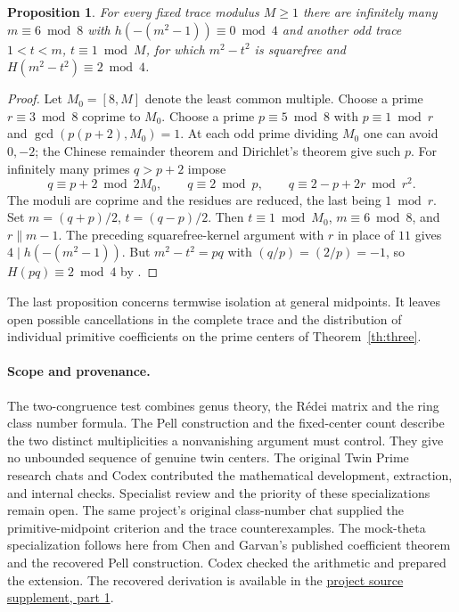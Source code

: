 \documentclass[11pt]{article}
\newtheorem{proposition}[theorem]{Proposition}
\begin{document}
\begin{proposition}\label{prop:fixedtrace}
For every fixed trace modulus $M\ge1$ there are infinitely many
$m\equiv6\bmod8$ with $h(-(m^2-1))\equiv0\bmod4$ and another
odd trace $1<t<m$, $t\equiv1\bmod M$, for which
$m^2-t^2$ is squarefree and $H(m^2-t^2)\equiv2\bmod4$.
\end{proposition}
\begin{proof}
Let $M_0=[8,M]$ denote the least common multiple. Choose a prime
$r\equiv3\bmod8$ coprime to $M_0$. Choose a prime $p\equiv5\bmod8$
with $p\equiv1\bmod r$ and $\gcd(p(p+2),M_0)=1$.
At each odd prime dividing $M_0$ one can avoid $0,-2$; the Chinese
remainder theorem and Dirichlet's theorem give such $p$. For infinitely
many primes $q>p+2$ impose
\[
 q\equiv p+2\bmod{2M_0},\qquad q\equiv2\bmod p,\qquad
 q\equiv2-p+2r\bmod{r^2}.
\]
The moduli are coprime and the residues are reduced, the last being
$1\bmod r$. Set $m=(q+p)/2$, $t=(q-p)/2$. Then $t\equiv1\bmod M_0$,
$m\equiv6\bmod8$, and $r\parallel m-1$. The preceding
squarefree-kernel argument with $r$ in place of $11$ gives
$4\mid h(-(m^2-1))$. But $m^2-t^2=pq$ with $(q/p)=(2/p)=-1$,
so $H(pq)\equiv2\bmod4$ by \cite[Theorem 2.3]{chen}.
\end{proof}
The last proposition concerns termwise isolation at general midpoints.
It leaves open possible cancellations in the complete trace and the
distribution of individual primitive coefficients on the prime centers
of Theorem~\ref{th:three}.

\paragraph{Scope and provenance.}
The two-congruence test combines genus theory, the R\'edei matrix
and the ring class number formula. The Pell construction and the
fixed-center count describe the two distinct multiplicities a
nonvanishing argument must control. They give no unbounded sequence
of genuine twin centers. The original Twin Prime research chats and
Codex contributed the mathematical development, extraction, and
internal checks. Specialist review and the priority of these
specializations remain open. The same project's original class-number
chat supplied the primitive-midpoint criterion and the trace
counterexamples. The mock-theta specialization follows here from
Chen and Garvan's published coefficient theorem and the recovered Pell
construction. Codex checked the arithmetic and prepared the extension.
The recovered derivation is available in the
\href{https://github.com/cosmosgeek0/Twin-Prime/blob/main/history/hosted-proofs-supplement.md}{project source supplement, part 1}.
\end{document}
